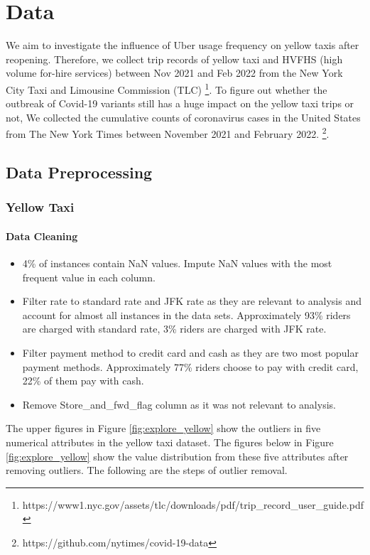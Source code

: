 \documentclass[11pt]{article}
\begin{document}
 
\section{Data}
We aim to investigate the influence of Uber usage frequency on yellow taxis after reopening. Therefore, we collect trip records of yellow taxi and HVFHS (high volume for-hire services)  between Nov 2021 and Feb 2022 from the New York City Taxi and Limousine Commission (TLC) \footnote{https://www1.nyc.gov/assets/tlc/downloads/pdf/trip\_record\_user\_guide.pdf}. To figure out whether the outbreak of Covid-19 variants still has a huge impact on the yellow taxi trips or not, We collected the cumulative counts of coronavirus cases in the United States from The New York Times between November 2021 and February 2022. \footnote{https://github.com/nytimes/covid-19-data}.

\subsection{Data Preprocessing}
\subsubsection{Yellow Taxi}

\paragraph{Data Cleaning}
\begin{itemize}
     \item 4\% of instances contain NaN values. Impute NaN values with the most frequent value in each column.
    \item Filter rate to standard rate and JFK rate as they are relevant to analysis and account for almost all instances in the data sets. Approximately 93\% riders are charged with standard rate, 3\% riders are charged with JFK rate.
    \item Filter payment method to credit card and cash as they are two most popular payment methods. Approximately 77\% riders choose to pay with credit card, 22\% of them pay with cash.
    \item Remove Store\_and\_fwd\_flag column as it was not relevant to analysis.
\end{itemize}



The upper figures in Figure \ref{fig:explore_yellow} show the outliers in five numerical attributes in the yellow taxi dataset. The figures below in Figure \ref{fig:explore_yellow} show the value distribution from these five attributes after removing outliers. The following are the steps of outlier removal.
\end{document}

